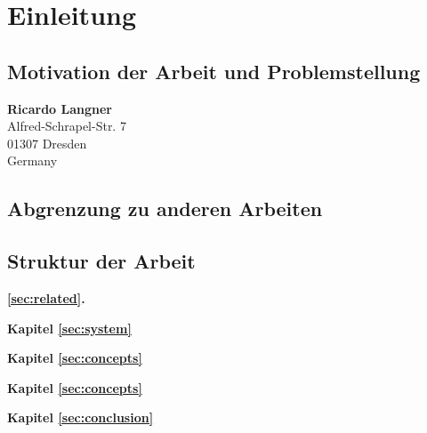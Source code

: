 %
\chapter{Einleitung}
\label{sec:intro}


\Blindtext[2][2]

\section{Motivation der Arbeit und Problemstellung}
\label{sec:intro:address}

\textbf{Ricardo Langner} \\
Alfred-Schrapel-Str. 7 \\
01307 Dresden \\
Germany


\section{Abgrenzung zu anderen Arbeiten}
\label{sec:intro:demarcation}

\Blindtext[3][1] \cite{Jurgens:2000,Jurgens:1995,Miede:2011,Kohm:2011,Apple:keynote:2010,Apple:numbers:2010,Apple:pages:2010}


\section{Struktur der Arbeit}
\label{sec:intro:structure}

\textbf{\ref{sec:related}. } \\[0.2em]
\blindtext

\textbf{Kapitel \ref{sec:system}} \\[0.2em]
\blindtext

\textbf{Kapitel \ref{sec:concepts}} \\[0.2em]
\blindtext

\textbf{Kapitel \ref{sec:concepts}} \\[0.2em]
\blindtext

\textbf{Kapitel \ref{sec:conclusion}} \\[0.2em]
\blindtext
